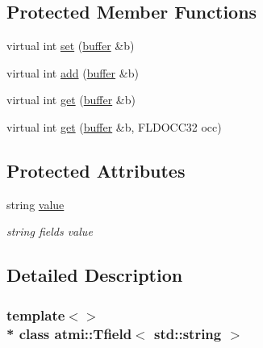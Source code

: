 \subsection*{Protected Member Functions}
\begin{DoxyCompactItemize}
\item 
virtual int \hyperlink{classatmi_1_1_tfield_3_01std_1_1string_01_4_a356a0e794a33bcfc1d3f4d8376e764d9}{set} (\hyperlink{classatmi_1_1buffer}{buffer} \&b)
\item 
virtual int \hyperlink{classatmi_1_1_tfield_3_01std_1_1string_01_4_af17fc3c22ce857f9d96f96d6c175b6d5}{add} (\hyperlink{classatmi_1_1buffer}{buffer} \&b)
\item 
virtual int \hyperlink{classatmi_1_1_tfield_3_01std_1_1string_01_4_afecf8218a3c312df34c36f334c995ac7}{get} (\hyperlink{classatmi_1_1buffer}{buffer} \&b)
\item 
virtual int \hyperlink{classatmi_1_1_tfield_3_01std_1_1string_01_4_a34f9956af4b0b98730595258e6c251e2}{get} (\hyperlink{classatmi_1_1buffer}{buffer} \&b, F\+L\+D\+O\+C\+C32 occ)
\end{DoxyCompactItemize}
\subsection*{Protected Attributes}
\begin{DoxyCompactItemize}
\item 
string \hyperlink{classatmi_1_1_tfield_3_01std_1_1string_01_4_a8c0e9d6d6ef699d221ef18fb0a048230}{value}\hypertarget{classatmi_1_1_tfield_3_01std_1_1string_01_4_a8c0e9d6d6ef699d221ef18fb0a048230}{}\label{classatmi_1_1_tfield_3_01std_1_1string_01_4_a8c0e9d6d6ef699d221ef18fb0a048230}

\begin{DoxyCompactList}\small\item\em string field\textquotesingle{}s value \end{DoxyCompactList}\end{DoxyCompactItemize}


\subsection{Detailed Description}
\subsubsection*{template$<$$>$\\*
class atmi\+::\+Tfield$<$ std\+::string $>$}

